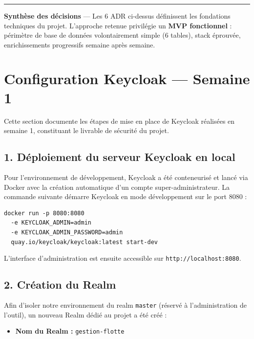 \documentclass[10pt,a4paper]{article}
\newcommand{\ruledline}{\textcolor{rule}{\rule{\linewidth}{0.4pt}}\vspace{4pt}}
\begin{document}
\vspace{8pt}
\ruledline
{\small\color{muted}
\textbf{Synthèse des décisions} --- Les 6 ADR ci-dessus définissent les fondations techniques du projet. L'approche retenue privilégie un \textbf{MVP fonctionnel} : périmètre de base de données volontairement simple (6 tables), stack éprouvée, enrichissements progressifs semaine après semaine.
}

\newpage

\section{Configuration Keycloak --- Semaine 1}

Cette section documente les étapes de mise en place de Keycloak réalisées en semaine 1, constituant le livrable de sécurité du projet.

\subsection{1. Déploiement du serveur Keycloak en local}

Pour l'environnement de développement, Keycloak a été conteneurisé et lancé via Docker avec la création automatique d'un compte super-administrateur. La commande suivante démarre Keycloak en mode développement sur le port 8080 :

\begin{verbatim}
docker run -p 8080:8080
  -e KEYCLOAK_ADMIN=admin
  -e KEYCLOAK_ADMIN_PASSWORD=admin
  quay.io/keycloak/keycloak:latest start-dev
\end{verbatim}

L'interface d'administration est ensuite accessible sur \texttt{http://localhost:8080}.

\subsection{2. Création du Realm}

Afin d'isoler notre environnement du realm \texttt{master} (réservé à l'administration de l'outil), un nouveau Realm dédié au projet a été créé :

\begin{itemize}[noitemsep]
  \item \textbf{Nom du Realm :} \texttt{gestion-flotte}
\end{itemize}
\end{document}
